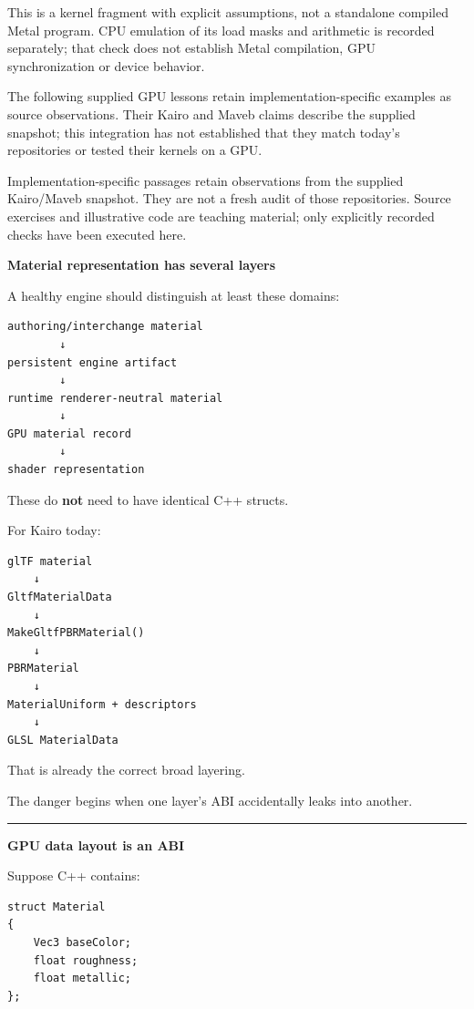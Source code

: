 This is a kernel fragment with explicit assumptions, not a standalone compiled Metal program. CPU emulation of its load masks and arithmetic is recorded separately; that check does not establish Metal compilation, GPU synchronization or device behavior.

The following supplied GPU lessons retain implementation-specific examples as source observations. Their Kairo and Maveb claims describe the supplied snapshot; this integration has not established that they match today's repositories or tested their kernels on a GPU.

Implementation-specific passages retain observations from the supplied Kairo/Maveb snapshot. They are not a fresh audit of those repositories. Source exercises and illustrative code are teaching material; only explicitly recorded checks have been executed here.

\textbf{Material representation has several layers}

A healthy engine should distinguish at least these domains:

\begin{verbatim}
authoring/interchange material
        ↓
persistent engine artifact
        ↓
runtime renderer-neutral material
        ↓
GPU material record
        ↓
shader representation
\end{verbatim}

These do \textbf{not} need to have identical C++ structs.

For Kairo today:

\begin{verbatim}
glTF material
    ↓
GltfMaterialData
    ↓
MakeGltfPBRMaterial()
    ↓
PBRMaterial
    ↓
MaterialUniform + descriptors
    ↓
GLSL MaterialData
\end{verbatim}

That is already the correct broad layering.

The danger begins when one layer's ABI accidentally leaks into another.

\begin{center}\rule{0.5\linewidth}{0.5pt}\end{center}

\textbf{GPU data layout is an ABI}

Suppose C++ contains:

\begin{verbatim}
struct Material
{
    Vec3 baseColor;
    float roughness;
    float metallic;
};
\end{verbatim}

